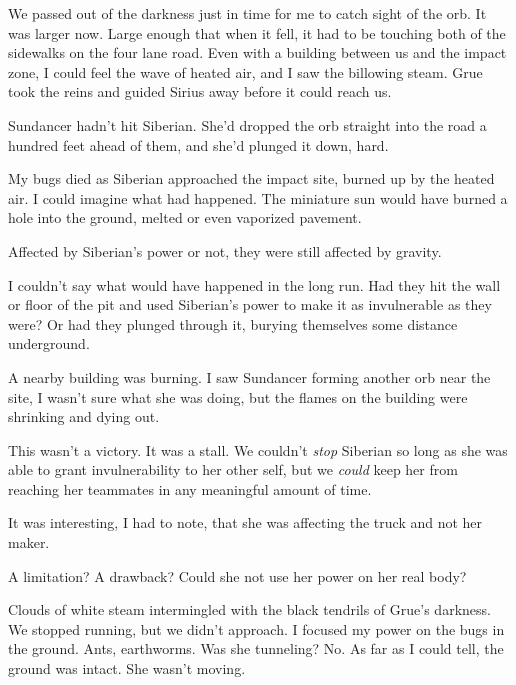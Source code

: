 We passed out of the darkness just in time for me to catch sight of the orb.  It was larger now.  Large enough that when it fell, it had to be touching both of the sidewalks on the four lane road.  Even with a building between us and the impact zone, I could feel the wave of heated air, and I saw the billowing steam.  Grue took the reins and guided Sirius away before it could reach us.



Sundancer hadn't hit Siberian.  She'd dropped the orb straight into the road a hundred feet ahead of them, and she'd plunged it down, hard.



My bugs died as Siberian approached the impact site, burned up by the heated air.  I could imagine what had happened.  The miniature sun would have burned a hole into the ground, melted or even vaporized pavement.



Affected by Siberian's power or not, they were still affected by gravity.



I couldn't say what would have happened in the long run.  Had they hit the wall or floor of the pit and used Siberian's power to make it as invulnerable as they were?  Or had they plunged through it, burying themselves some distance underground.



A nearby building was burning.  I saw Sundancer forming another orb near the site, I wasn't sure what she was doing, but the flames on the building were shrinking and dying out.



This wasn't a victory.  It was a stall.  We couldn't \emph{stop} Siberian so long as she was able to grant invulnerability to her other self, but we \emph{could} keep her from reaching her teammates in any meaningful amount of time.



It was interesting, I had to note, that she was affecting the truck and not her maker.



A limitation?  A drawback?  Could she not use her power on her real body?



Clouds of white steam intermingled with the black tendrils of Grue's darkness.  We stopped running, but we didn't approach.  I focused my power on the bugs in the ground.  Ants, earthworms.  Was she tunneling?  No.  As far as I could tell, the ground was intact.  She wasn't moving.



